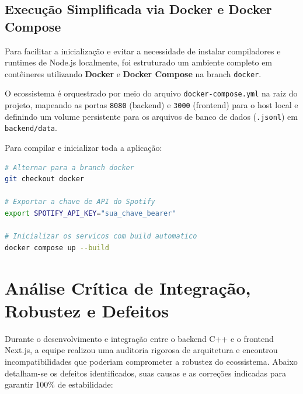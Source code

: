 \documentclass[12pt,a4paper]{article}
\begin{document}
\subsection{Execução Simplificada via Docker e Docker Compose}
Para facilitar a inicialização e evitar a necessidade de instalar compiladores e runtimes de Node.js localmente, foi estruturado um ambiente completo em contêineres utilizando \textbf{Docker} e \textbf{Docker Compose} na branch \texttt{docker}.

O ecossistema é orquestrado por meio do arquivo \texttt{docker-compose.yml} na raiz do projeto, mapeando as portas \texttt{8080} (backend) e \texttt{3000} (frontend) para o host local e definindo um volume persistente para os arquivos de banco de dados (\texttt{.jsonl}) em \texttt{backend/data}.

Para compilar e inicializar toda a aplicação:
\begin{lstlisting}[language=bash]
# Alternar para a branch docker
git checkout docker

# Exportar a chave de API do Spotify
export SPOTIFY_API_KEY="sua_chave_bearer"

# Inicializar os servicos com build automatico
docker compose up --build
\end{lstlisting}

\newpage
\section{Análise Crítica de Integração, Robustez e Defeitos}
Durante o desenvolvimento e integração entre o backend C++ e o frontend Next.js, a equipe realizou uma auditoria rigorosa de arquitetura e encontrou incompatibilidades que poderiam comprometer a robustez do ecossistema. Abaixo detalham-se os defeitos identificados, suas causas e as correções indicadas para garantir 100\% de estabilidade:
\end{document}
